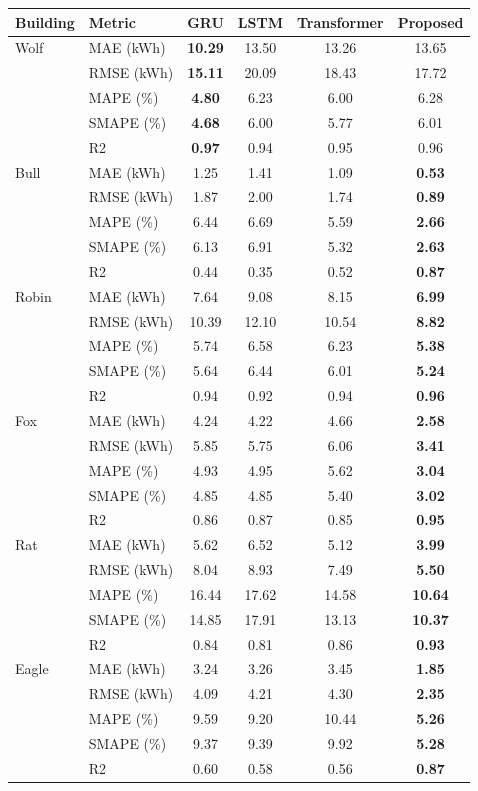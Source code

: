 \begin{tabular}{llcccc}
\toprule
Building & Metric & GRU & LSTM & Transformer & Proposed \\
\midrule
Wolf & MAE (kWh) & \textbf{10.29} & 13.50 & 13.26 & 13.65 \\
 & RMSE (kWh) & \textbf{15.11} & 20.09 & 18.43 & 17.72 \\
 & MAPE (\%) & \textbf{4.80} & 6.23 & 6.00 & 6.28 \\
 & SMAPE (\%) & \textbf{4.68} & 6.00 & 5.77 & 6.01 \\
 & R2 & \textbf{0.97} & 0.94 & 0.95 & 0.96 \\
\midrule
Bull & MAE (kWh) & 1.25 & 1.41 & 1.09 & \textbf{0.53} \\
 & RMSE (kWh) & 1.87 & 2.00 & 1.74 & \textbf{0.89} \\
 & MAPE (\%) & 6.44 & 6.69 & 5.59 & \textbf{2.66} \\
 & SMAPE (\%) & 6.13 & 6.91 & 5.32 & \textbf{2.63} \\
 & R2 & 0.44 & 0.35 & 0.52 & \textbf{0.87} \\
\midrule
Robin & MAE (kWh) & 7.64 & 9.08 & 8.15 & \textbf{6.99} \\
 & RMSE (kWh) & 10.39 & 12.10 & 10.54 & \textbf{8.82} \\
 & MAPE (\%) & 5.74 & 6.58 & 6.23 & \textbf{5.38} \\
 & SMAPE (\%) & 5.64 & 6.44 & 6.01 & \textbf{5.24} \\
 & R2 & 0.94 & 0.92 & 0.94 & \textbf{0.96} \\
\midrule
Fox & MAE (kWh) & 4.24 & 4.22 & 4.66 & \textbf{2.58} \\
 & RMSE (kWh) & 5.85 & 5.75 & 6.06 & \textbf{3.41} \\
 & MAPE (\%) & 4.93 & 4.95 & 5.62 & \textbf{3.04} \\
 & SMAPE (\%) & 4.85 & 4.85 & 5.40 & \textbf{3.02} \\
 & R2 & 0.86 & 0.87 & 0.85 & \textbf{0.95} \\
\midrule
Rat & MAE (kWh) & 5.62 & 6.52 & 5.12 & \textbf{3.99} \\
 & RMSE (kWh) & 8.04 & 8.93 & 7.49 & \textbf{5.50} \\
 & MAPE (\%) & 16.44 & 17.62 & 14.58 & \textbf{10.64} \\
 & SMAPE (\%) & 14.85 & 17.91 & 13.13 & \textbf{10.37} \\
 & R2 & 0.84 & 0.81 & 0.86 & \textbf{0.93} \\
\midrule
Eagle & MAE (kWh) & 3.24 & 3.26 & 3.45 & \textbf{1.85} \\
 & RMSE (kWh) & 4.09 & 4.21 & 4.30 & \textbf{2.35} \\
 & MAPE (\%) & 9.59 & 9.20 & 10.44 & \textbf{5.26} \\
 & SMAPE (\%) & 9.37 & 9.39 & 9.92 & \textbf{5.28} \\
 & R2 & 0.60 & 0.58 & 0.56 & \textbf{0.87} \\
\bottomrule
\end{tabular}